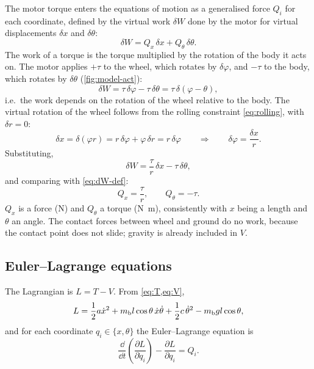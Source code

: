 The motor torque enters the equations of motion as a generalised force
$Q_i$ for each coordinate, defined by the virtual work $\delta W$ done by the
motor for virtual displacements $\delta x$ and $\delta\theta$:
\begin{equation}
  \delta W = Q_x\,\delta x + Q_\theta\,\delta\theta .
  \label{eq:dW-def}
\end{equation}
The work of a torque is the torque multiplied by the rotation of the body it
acts on. The motor applies $+\tau$ to the wheel, which rotates by
$\delta\varphi$, and $-\tau$ to the body, which rotates by $\delta\theta$
(\cref{fig:model-act}):
\begin{equation}
  \delta W = \tau\,\delta\varphi - \tau\,\delta\theta = \tau\,\delta(\varphi - \theta),
\end{equation}
i.e.\ the work depends on the rotation of the wheel relative to the body. The
virtual rotation of the wheel follows from the rolling constraint
\cref{eq:rolling}, with $\delta r = 0$:
\begin{equation}
  \delta x = \delta(\varphi r) = r\,\delta\varphi + \varphi\,\delta r = r\,\delta\varphi
  \qquad\Longrightarrow\qquad
  \delta\varphi = \frac{\delta x}{r}.
\end{equation}
Substituting,
\begin{equation}
  \delta W = \frac{\tau}{r}\,\delta x - \tau\,\delta\theta ,
\end{equation}
and comparing with \cref{eq:dW-def}:
\begin{equation}
  Q_x = \frac{\tau}{r}, \qquad Q_\theta = -\tau .
  \label{eq:Q}
\end{equation}
$Q_x$ is a force (\si{N}) and $Q_\theta$ a torque (\si{N.m}), consistently with
$x$ being a length and $\theta$ an angle. The contact forces between wheel and
ground do no work, because the contact point does not slide; gravity is
already included in $V$.

\subsection{Euler--Lagrange equations}

The Lagrangian is $L = T - V$. From \cref{eq:T,eq:V},
\begin{equation}
  L = \frac12 a\dot x^2 + m_{\mathrm b} l\cos\theta\,\dot x\dot\theta + \frac12 c\,\dot\theta^2 - m_{\mathrm b} g l\cos\theta ,
  \label{eq:L}
\end{equation}
and for each coordinate $q_i\in\{x,\theta\}$ the Euler--Lagrange equation is
\begin{equation}
  \frac{\dd}{\dd t}\left(\frac{\partial L}{\partial\dot q_i}\right) - \frac{\partial L}{\partial q_i} = Q_i .
  \label{eq:EL}
\end{equation}

